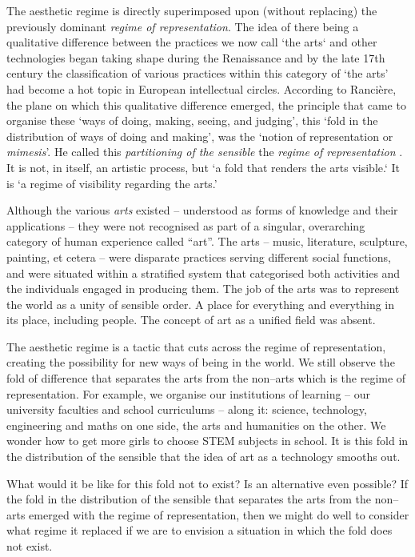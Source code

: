 \documentclass[letterpaper]{article}
\begin{document}
    The aesthetic regime is directly superimposed upon (without replacing) the previously dominant \emph{regime of representation}. The idea of there being a qualitative difference between the practices we now call ‘the arts‘ and other technologies began taking shape during the Renaissance \citep[p.136]{TatarkiewiczWhtIsArt1971} and by the late 17th century the classification of various practices within this category of ‘the arts’ had become a hot topic in European intellectual circles. According to Rancière, the plane on which this qualitative difference emerged, the principle that came to organise these ‘ways of doing, making, seeing, and judging’, this ‘fold in the distribution of ways of doing and making’, was the ‘notion of representation or \emph{mimesis}’. He called this \emph{partitioning of the sensible} the \emph{regime of representation} \citep[p.22]{RancierPltcsOfThAsthtcs2004}. It is not, in itself, an artistic process, but ‘a fold that renders the arts visible.‘ It is  ‘a regime of visibility regarding the arts.’
    
    Although the various \emph{arts} existed – understood as forms of knowledge and their applications – they were not recognised as part of a singular, overarching category of human experience called “art”. The arts – music, literature, sculpture, painting, et cetera – were disparate practices serving different social functions, and were situated within a stratified system that categorised both activities and the individuals engaged in producing them. The job of the arts was to represent the world as a unity of sensible order. A place for everything and everything in its place, including people. The concept of art as a unified field was absent.
    
    The aesthetic regime is a tactic that cuts across the regime of representation, creating the possibility for new ways of being in the world. We still observe the fold of difference that separates the arts from the non–arts which is the regime of representation. For example, we organise our institutions of learning – our university faculties and school curriculums – along it: science, technology, engineering and maths on one side, the arts and humanities on the other. We wonder how to get more girls to choose STEM subjects in school. It is this fold in the distribution of the sensible that the idea of art as a technology smooths out.
    
    What would it be like for this fold not to exist? Is an alternative even possible? If the fold in the distribution of the sensible that separates the arts from the non–arts emerged with the regime of representation, then we might do well to consider what regime it replaced if we are to envision a situation in which the fold does not exist.
    
\end{document}
